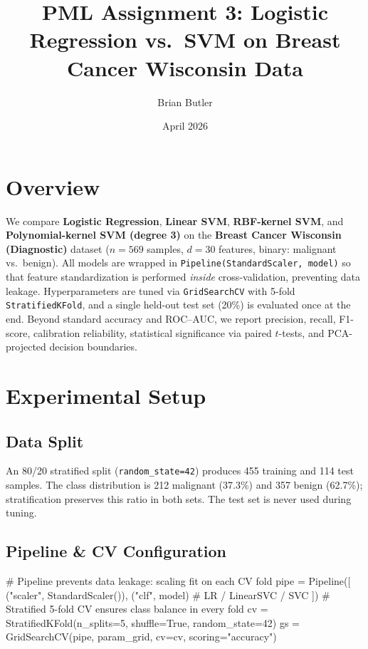 \documentclass[10pt, letterpaper]{article}
\title{\vspace{-2em}\textbf{PML Assignment 3: Logistic Regression vs.\ SVM on Breast Cancer Wisconsin Data}\vspace{-0.5em}}
\author{Brian Butler}
\date{April 2026}
\begin{document}
\maketitle
\vspace{-1em}

\section{Overview}

We compare \textbf{Logistic Regression}, \textbf{Linear SVM}, \textbf{RBF-kernel SVM}, and \textbf{Polynomial-kernel SVM (degree 3)} on the \textbf{Breast Cancer Wisconsin (Diagnostic)} dataset ($n{=}569$ samples, $d{=}30$ features, binary: malignant vs.\ benign).
All models are wrapped in \texttt{Pipeline(StandardScaler, model)} so that feature standardization is performed \emph{inside} cross-validation, preventing data leakage.
Hyperparameters are tuned via \texttt{GridSearchCV} with 5-fold \texttt{StratifiedKFold}, and a single held-out test set (20\%) is evaluated once at the end.
Beyond standard accuracy and ROC--AUC, we report precision, recall, F1-score, calibration reliability, statistical significance via paired $t$-tests, and PCA-projected decision boundaries.

\section{Experimental Setup}

\subsection{Data Split}
An 80/20 stratified split (\texttt{random\_state=42}) produces 455 training and 114 test samples.
The class distribution is 212 malignant (37.3\%) and 357 benign (62.7\%); stratification preserves this ratio in both sets.
The test set is never used during tuning.

\subsection{Pipeline \& CV Configuration}
\begin{code}
# Pipeline prevents data leakage: scaling fit on each CV fold
pipe = Pipeline([
    ("scaler", StandardScaler()),
    ("clf",    model)   # LR / LinearSVC / SVC
])
# Stratified 5-fold CV ensures class balance in every fold
cv = StratifiedKFold(n_splits=5, shuffle=True, random_state=42)
gs = GridSearchCV(pipe, param_grid, cv=cv, scoring="accuracy")
\end{code}
\end{document}

